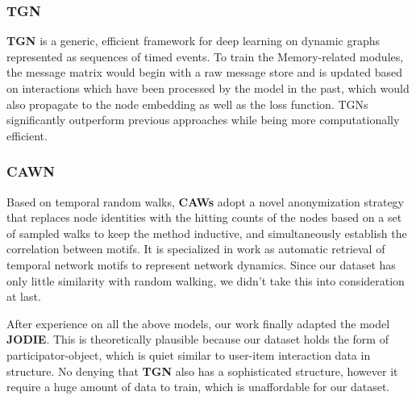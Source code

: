 \subsubsection{TGN}
\textbf{TGN}\cite{rossi2006temporal} is a generic, efficient framework for deep learning on dynamic graphs represented as sequences of timed events. To train the Memory-related modules, the message matrix would begin with a raw message store and is updated based on interactions which have been processed by the model in the past, which would also propagate to the node embedding as well as the loss function.  TGNs significantly outperform previous approaches while being more computationally efficient.

\subsubsection{CAWN}
Based on temporal random walks, \textbf{CAWs} adopt a novel anonymization strategy that replaces node identities with the hitting counts of the nodes based on a set of sampled walks to keep the method inductive, and simultaneously establish the correlation between motifs. It is specialized in work as automatic retrieval of temporal network motifs to represent network dynamics. Since our dataset has only little similarity with random walking, we didn't take this into consideration at last.

After experience on all the above models, our work finally adapted the model \textbf{JODIE}. This is theoretically plausible because our dataset holds the form of participator-object, which is quiet similar to user-item interaction data in structure. No denying that \textbf{TGN} also has a sophisticated structure, however it require a huge amount of data to train, which is unaffordable for our dataset.